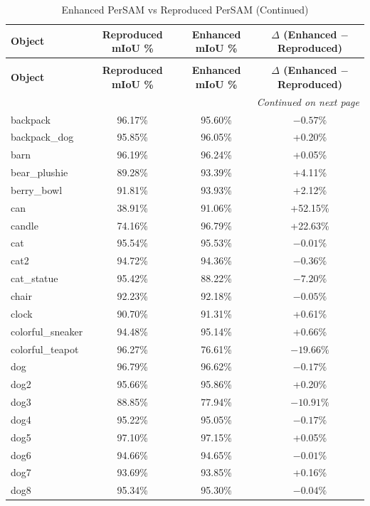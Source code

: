 \documentclass[journal,12pt,onecolumn,draftclsnofoot]{IEEEtran}
\begin{document}
\small
\setlength{\tabcolsep}{4pt}
\begin{longtable}{l c c c}
\caption{Enhanced PerSAM vs Reproduced PerSAM (mIoU)} \label{tab:enh_persam_per_object} \\
\toprule
\textbf{Object} & \textbf{Reproduced mIoU \%} & \textbf{Enhanced mIoU \%} & \textbf{$\Delta$ (Enhanced $-$ Reproduced)} \\ \midrule
\endfirsthead
\caption[]{Enhanced PerSAM vs Reproduced PerSAM (Continued)} \\
\toprule
\textbf{Object} & \textbf{Reproduced mIoU \%} & \textbf{Enhanced mIoU \%} & \textbf{$\Delta$ (Enhanced $-$ Reproduced)} \\ \midrule
\endhead
\midrule \multicolumn{4}{r}{\textit{Continued on next page}} \\
\endfoot
\bottomrule
\endlastfoot
backpack & 96.17\% & 95.60\% & $-0.57\%$ \\
backpack\_dog & 95.85\% & 96.05\% & +0.20\% \\
barn & 96.19\% & 96.24\% & +0.05\% \\
bear\_plushie & 89.28\% & 93.39\% & +4.11\% \\
berry\_bowl & 91.81\% & 93.93\% & +2.12\% \\
can & 38.91\% & 91.06\% & +52.15\% \\
candle & 74.16\% & 96.79\% & +22.63\% \\
cat & 95.54\% & 95.53\% & $-0.01\%$ \\
cat2 & 94.72\% & 94.36\% & $-0.36\%$ \\
cat\_statue & 95.42\% & 88.22\% & $-7.20\%$ \\
chair & 92.23\% & 92.18\% & $-0.05\%$ \\
clock & 90.70\% & 91.31\% & +0.61\% \\
colorful\_sneaker & 94.48\% & 95.14\% & +0.66\% \\
colorful\_teapot & 96.27\% & 76.61\% & $-19.66\%$ \\
dog & 96.79\% & 96.62\% & $-0.17\%$ \\
dog2 & 95.66\% & 95.86\% & +0.20\% \\
dog3 & 88.85\% & 77.94\% & $-10.91\%$ \\
dog4 & 95.22\% & 95.05\% & $-0.17\%$ \\
dog5 & 97.10\% & 97.15\% & +0.05\% \\
dog6 & 94.66\% & 94.65\% & $-0.01\%$ \\
dog7 & 93.69\% & 93.85\% & +0.16\% \\
dog8 & 95.34\% & 95.30\% & $-0.04\%$ \\

\end{longtable}
\end{document}

